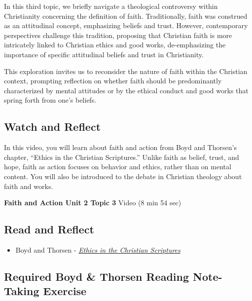 \documentclass[
]{book}
\providecommand{\tightlist}{%
  \setlength{\itemsep}{0pt}\setlength{\parskip}{0pt}}
\begin{document}
In this third topic, we briefly navigate a theological controversy within Christianity concerning the definition of faith. Traditionally, faith was construed as an attitudinal concept, emphasizing beliefs and trust. However, contemporary perspectives challenge this tradition, proposing that Christian faith is more intricately linked to Christian ethics and good works, de-emphasizing the importance of specific attitudinal beliefs and trust in Christianity.

This exploration invites us to reconsider the nature of faith within the Christian context, prompting reflection on whether faith should be predominantly characterized by mental attitudes or by the ethical conduct and good works that spring forth from one's beliefs.

\hypertarget{watch-and-reflect-10}{%
\subsection*{Watch and Reflect}\label{watch-and-reflect-10}}

In this video, you will learn about faith and action from Boyd and Thorsen's chapter, ``Ethics in the Christian Scriptures.'' Unlike faith as belief, trust, and hope, faith as action focuses on behavior and ethics, rather than on mental content. You will also be introduced to the debate in Christian theology about faith and works.

\textbf{Faith and Action Unit 2 Topic 3} Video (8 min 54 sec)

\hypertarget{read-and-reflect-5}{%
\subsection*{Read and Reflect}\label{read-and-reflect-5}}

\begin{itemize}
\tightlist
\item
  Boyd and Thorsen - \href{assets/u2/PHIL-100-Boyd-and-Thorsen-Ethics-in-the-Christian-Scriptures.pdf}{\emph{Ethics in the Christian Scriptures}}
\end{itemize}

\hypertarget{required-boyd-thorsen-reading-note-taking-exercise}{%
\subsection*{Required Boyd \& Thorsen Reading Note-Taking Exercise}\label{required-boyd-thorsen-reading-note-taking-exercise}}
\end{document}
